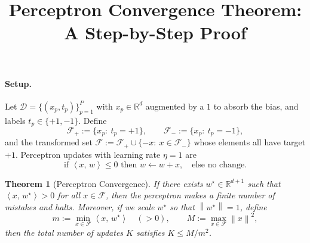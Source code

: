\documentclass[11pt]{article}
\newtheorem{theorem}{Theorem}
\newcommand{\norm}[1]{\left\lVert #1 \right\rVert}
\newcommand{\inner}[2]{\left\langle #1,\, #2 \right\rangle}
\begin{document}
\title{Perceptron Convergence Theorem: A Step-by-Step Proof}
\author{}
\date{}
\maketitle

\paragraph{Setup.}
Let $\mathcal{D}=\{(x_p,t_p)\}_{p=1}^P$ with $x_p\in\mathbb{R}^{d}$ augmented by a $1$ to absorb the bias, and labels $t_p\in\{+1,-1\}$. Define
\[
\mathcal{F}_+ := \{x_p:\ t_p=+1\},\qquad \mathcal{F}_- := \{x_p:\ t_p=-1\},
\]
and the transformed set $\mathcal{F} := \mathcal{F}_+ \cup \{-x:\ x\in \mathcal{F}_-\}$ whose elements all have target $+1$.
Perceptron updates with learning rate $\eta=1$ are
\[
\text{if }\inner{x}{w}\le 0 \text{ then } w \leftarrow w + x,\quad \text{else no change.}
\]

\begin{theorem}[Perceptron Convergence]
If there exists $w^\star\in\mathbb{R}^{d+1}$ such that $\inner{x}{w^\star} > 0$ for all $x\in\mathcal{F}$, then the perceptron makes a finite number of mistakes and halts. Moreover, if we scale $w^\star$ so that $\norm{w^\star}=1$, define
\[
m := \min_{x\in\mathcal{F}} \inner{x}{w^\star} \quad (>0),\qquad
M := \max_{x\in\mathcal{F}} \norm{x}^2,
\]
then the total number of updates $K$ satisfies $K \le M/m^2$.
\end{theorem}
\end{document}
